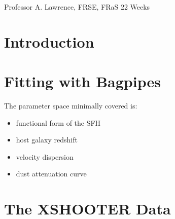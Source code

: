 \documentclass[a4paper,11pt]{article}
\begin{document}
\vfill
{} Professor A. Lawrence, FRSE, FRaS
\hfill
22 Weeks

\newpage
\setcounter{page}{1} %
\tableofcontents

\newpage
\section{Introduction}\label{sec:introduction}

\section{Fitting with Bagpipes}\label{sec:fitting_with_bagpipes}

The parameter space minimally covered is:

\begin{itemize}
  \item functional form of the SFH
  \item host galaxy redshift
  \item velocity dispersion
  \item dust attenuation curve
\end{itemize}

\section{The XSHOOTER Data}\label{sec:xshooter_data}
\end{document}
